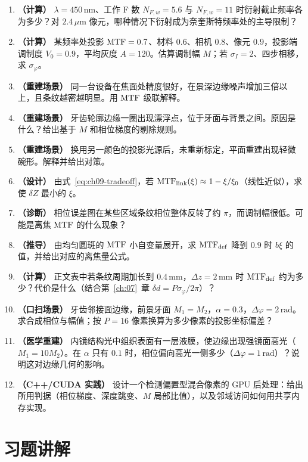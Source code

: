 \begin{enumerate}
  \item \textbf{（计算）} $\lambda=450\,\mathrm{nm}$、工作 F 数 $N_{F,w}=5.6$ 与 $N_{F,w}=11$ 时衍射截止频率各为多少？对 $2.4\,\mu\mathrm{m}$ 像元，哪种情况下衍射成为奈奎斯特频率处的主导限制？
  \item \textbf{（计算）} 某频率处投影 $\mathrm{MTF}=0.7$、材料 $0.6$、相机 $0.8$、像元 $0.9$，投影端调制度 $V_0=0.9$，平均灰度 $A=120$。估算调制幅 $M$；若 $\sigma_I=2$、四步相移，求 $\sigma_\varphi$。
  \item \textbf{（重建场景）} 同一台设备在焦面处精度很好，在景深边缘噪声增加三倍以上，且条纹越密越明显。用 $\mathrm{MTF}$ 级联解释。
  \item \textbf{（重建场景）} 牙齿轮廓边缘一圈出现漂浮点，位于牙面与背景之间。原因是什么？给出基于 $M$ 和相位梯度的剔除规则。
  \item \textbf{（重建场景）} 换用另一颜色的投影光源后，未重新标定，平面重建出现轻微碗形。解释并给出对策。
  \item \textbf{（设计）} 由式~\eqref{eq:ch09-tradeoff}，若 $\mathrm{MTF}_{\mathrm{link}}(\xi)\approx1-\xi/\xi_0$（线性近似），求使 $\delta Z$ 最小的 $\xi$。
  \item \textbf{（诊断）} 相位误差图在某些区域条纹相位整体反转了约 $\pi$，而调制幅很低。可能是离焦 $\mathrm{MTF}$ 的什么现象？
  \item \textbf{（推导）} 由均匀圆斑的 $\mathrm{MTF}$ 小自变量展开，求 $\mathrm{MTF}_{\mathrm{def}}$ 降到 $0.9$ 时 $b\xi$ 的值，并给出对应的离焦量公式。
  \item \textbf{（计算）} 正文表中若条纹周期加长到 $0.4\,\mathrm{mm}$，$\Delta z=2\,\mathrm{mm}$ 时 $\mathrm{MTF}_{\mathrm{def}}$ 约为多少？代价是什么（结合第~\ref{ch:07}~章 $\delta d=P\sigma_\varphi/2\pi$）？
  \item \textbf{（口扫场景）} 牙齿邻接面边缘，前景牙面 $M_1=M_2$，$\alpha=0.3$，$\Delta\varphi=2\,\mathrm{rad}$。求合成相位与幅值；按 $P=16$ 像素换算为多少像素的投影坐标偏差？
  \item \textbf{（医学重建）} 内镜结构光中组织表面有一层液膜，使边缘出现强镜面高光（$M_1=10M_2$）。在 $\alpha$ 只有 $0.1$ 时，相位偏向高光一侧多少（$\Delta\varphi=1\,\mathrm{rad}$）？说明这对边缘几何的影响。
  \item \textbf{（C++/CUDA 实践）} 设计一个检测偏置型混合像素的 GPU 后处理：给出所用判据（相位梯度、深度跳变、$M$ 局部比值），以及邻域访问如何用共享内存实现。
\end{enumerate}

\section{习题讲解}
\label{sec:ch08-solutions}

